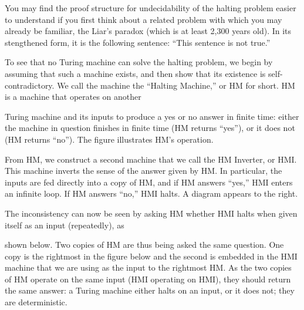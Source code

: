 You may find the proof structure for undecidability of the halting problem
easier to understand if
you first think about a related problem with which you may
already be familiar, the Liar's paradox
(which is at least 2,300 years old).  In its stengthened form, it is
the following sentence: ``This sentence is not true.''

\begin{minipage}{4.25in}
To see that no Turing machine can solve the halting problem, we begin
by assuming that such a machine exists, and then show that its
existence is self-contradictory.  We call the machine the ``Halting
Machine,'' or HM for short.  HM is a machine that operates on 
another\linebreak
\end{minipage}\hspace{.25in}%
\begin{minipage}{2in}
\end{minipage}\mpdone

Turing machine and its inputs to produce a yes or no answer in finite time:
either the machine in question finishes in finite time (HM returns
``yes''), or it does not (HM returns ``no'').  The figure illustrates
HM's operation.

\begin{minipage}{3.45in}
From HM, we construct a second machine that we call the HM Inverter,
or HMI.  This machine inverts the sense of the answer given by HM.  In
particular, the inputs are fed directly into a copy of HM, and if HM
answers ``yes,'' HMI enters an infinite loop.  If HM answers ``no,'' HMI
halts.  A diagram appears to the right.\mpline

The inconsistency can now be seen by asking HM whether HMI halts when
given itself as an input (repeatedly), as\linebreak
\end{minipage}\hspace{.25in}%
\begin{minipage}{2.8in}
\vspace{12pt}
\end{minipage}\mpdone

shown below.  Two
copies of HM are thus
being asked the same question.  One copy is the rightmost in the figure below
and the second is embedded in the HMI machine that we are using as the
input to the rightmost HM.  As the two copies of HM operate on the same input
(HMI operating on HMI), they should return the same answer: a Turing
machine either halts on an input, or it does not; they are
deterministic.\\

